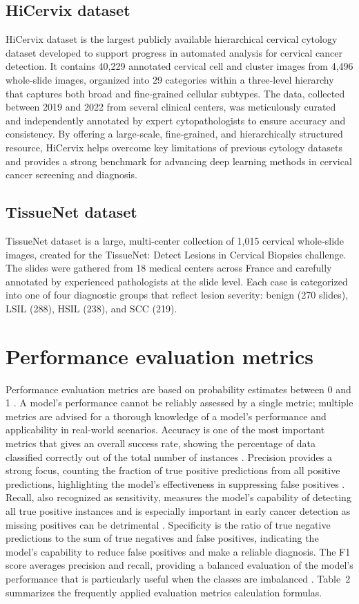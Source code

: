 \documentclass[final,5p,times,twocolumn,authoryear]{elsarticle}
\begin{document}
\subsection{HiCervix dataset}
HiCervix dataset \cite{ref22} is the largest publicly available hierarchical cervical cytology dataset developed to support progress in automated analysis for cervical cancer detection. It contains 40,229 annotated cervical cell and cluster images from 4,496 whole‑slide images, organized into 29 categories within a three‑level hierarchy that captures both broad and fine‑grained cellular subtypes. The data, collected between 2019 and 2022 from several clinical centers, was meticulously curated and independently annotated by expert cytopathologists to ensure accuracy and consistency. By offering a large‑scale, fine‑grained, and hierarchically structured resource, HiCervix helps overcome key limitations of previous cytology datasets and provides a strong benchmark for advancing deep learning methods in cervical cancer screening and diagnosis.
\subsection{TissueNet dataset}
TissueNet dataset \cite{ref23} is a large, multi‑center collection of 1,015 cervical whole‑slide images, created for the TissueNet: Detect Lesions in Cervical Biopsies challenge. The slides were gathered from 18 medical centers across France and carefully annotated by experienced pathologists at the slide level. Each case is categorized into one of four diagnostic groups that reflect lesion severity: benign (270 slides), LSIL (288), HSIL (238), and SCC (219).
\section{Performance evaluation metrics}
Performance evaluation metrics are based on probability estimates between 0 and 1 \cite{ref25}. A model’s performance cannot be reliably assessed by a single metric; multiple metrics are advised for a thorough knowledge of a model’s performance and applicability in real‑world scenarios. Accuracy is one of the most important metrics that gives an overall success rate, showing the percentage of data classified correctly out of the total number of instances \cite{ref2}. Precision provides a strong focus, counting the fraction of true positive predictions from all positive predictions, highlighting the model’s effectiveness in suppressing false positives \cite{ref26}. Recall, also recognized as sensitivity, measures the model’s capability of detecting all true positive instances and is especially important in early cancer detection as missing positives can be detrimental \cite{ref27}. Specificity is the ratio of true negative predictions to the sum of true negatives and false positives, indicating the model’s capability to reduce false positives and make a reliable diagnosis. The F1 score averages precision and recall, providing a balanced evaluation of the model’s performance that is particularly useful when the classes are imbalanced \cite{ref28,ref29}. Table 2 summarizes the frequently applied evaluation metrics calculation formulas.
\end{document}
